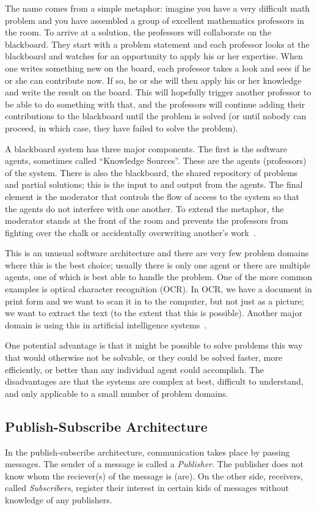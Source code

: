 The name comes from a simple metaphor: imagine you have a very difficult math problem and you have assembled a group of excellent mathematics professors in the room. To arrive at a solution, the professors will collaborate on the blackboard. They start with a problem statement and each professor looks at the blackboard and watches for an opportunity to apply his or her expertise. When one writes something new on the board, each professor takes a look and sees if he or she can contribute now. If so, he or she will then apply his or her knowledge and write the result on the board. This will hopefully trigger another professor to be able to do something with that, and the professors will continue adding their contributions to the blackboard until the problem is solved (or until nobody can proceed, in which case, they have failed to solve the problem).

A blackboard system has three major components. The first is the software agents, sometimes called ``Knowledge Sources''. These are the agents (professors) of the system. There is also the blackboard, the shared repository of problems and partial solutions; this is the input to and output from the agents. The final element is the moderator that controls the flow of access to the system so that the agents do not interfere with one another. To extend the metaphor, the moderator stands at the front of the room and prevents the professors from fighting over the chalk or accidentally overwriting another's work~\cite{blackboard}.

This is an unusual software architecture and there are very few problem domains where this is the best choice; usually there is only one agent or there are multiple agents, one of which is best able to handle the problem. One of the more common examples is optical character recognition (OCR). In OCR, we have a document in print form and we want to scan it in to the computer, but not just as a picture; we want to extract the text (to the extent that this is possible). Another major domain is using this in artificial intelligence systems~\cite{blackboard2}.

One potential advantage is that it might be possible to solve problems this way that would otherwise not be solvable, or they could be solved faster, more efficiently, or better than any individual agent could accomplish. The disadvantages are that the systems are complex at best, difficult to understand, and only applicable to a small number of problem domains.


\subsection*{Publish-Subscribe Architecture}
In the publish-subscribe architecture, communication takes place by passing messages. The sender of a message is called a \textit{Publisher}. The publisher does not know whom the reciever(s) of the message is (are). On the other side, receivers, called \textit{Subscribers}, register their interest in certain kids of messages without knowledge of any publishers.

